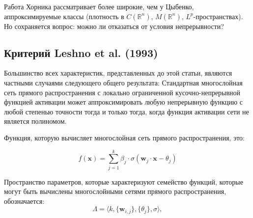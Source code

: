 \documentclass[12pt]{article}
\begin{document}
	Работа Хорника рассматривает более широкие, чем у Цыбенко, аппроксимируемые классы (плотность в $C(\mathbb{R}^n)$, $M(\mathbb{R}^n)$, $L^p$-пространствах). Но сохраняется вопрос: можно ли отказаться от условия непрерывности?
	
	\subsection{Критерий Leshno et al. (1993)}
	
	Большинство всех характеристик, представленных до этой статьи, являются частными случаями следующего общего результата: Стандартная многослойная сеть прямого распространения с локально ограниченной кусочно-непрерывной функцией активации может аппроксимировать любую непрерывную функцию с любой степенью точности тогда и только тогда, когда функция активации сети не является полиномом.
	
    Функция, которую вычисляет многослойная сеть прямого распространения, это:
	
	\begin{equation}
		f(\mathbf{x}) = \sum_{j=1}^{k} \beta_j \cdot \sigma(\mathbf{w}_j \cdot \mathbf{x} - \theta_j) \tag{1}
	\end{equation}
	
	Пространство параметров, которые характеризуют семейство функций, которые могут быть вычислены многослойными сетями прямого распространения, обозначается:
	\[
	\Lambda = \langle k, \{\mathbf{w}_{i,j}\}, \{\theta_j\}, \sigma \rangle,
	\]
	
\end{document}
